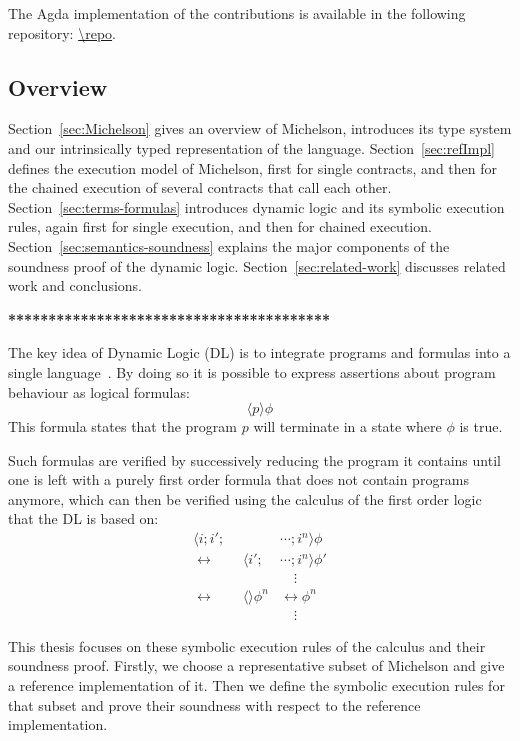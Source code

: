 The Agda implementation of the contributions is available in the
following repository: \url{\repo}. 

\subsection*{Overview}
\label{sec:overview}


Section~\ref{sec:Michelson} gives an overview of Michelson, introduces
its type system and our intrinsically typed representation of the language.
Section~\ref{sec:refImpl} defines the execution model of Michelson,
first for single contracts, and then for the chained execution of
several contracts that call each other.
Section~\ref{sec:terms-formulas} introduces dynamic logic and its
symbolic execution rules, again first for single execution, and then
for chained execution.
Section~\ref{sec:semantics-soundness} explains the major components of
the soundness proof of the dynamic logic.
Section~\ref{sec:related-work} discusses related work and conclusions.


\textbf{****************************************}

The key idea of Dynamic Logic (DL) is to integrate programs and formulas
into a single language~\cite{KeY3}.
By doing so it is possible to express assertions about program behaviour as logical formulas:
\[	\langle p \rangle \phi	\]
This formula states that the program $p$ will terminate in a state where $\phi$ is true.

Such formulas are verified by successively reducing the program it contains
until one is left with a purely first order formula that does not contain programs anymore,
which can then be verified using the calculus of the first order logic that
the DL is based on:
\begin{align*}
					\langle i ; i' ; &\cdots ; i^n \rangle \phi
\\ \leftrightarrow	\qquad		\langle     i' ; &\cdots ; i^n \rangle \phi'
\\							 &\quad\vdots
\\ \leftrightarrow	\qquad	\langle \rangle \phi^n	 &\leftrightarrow \phi^n
\\							 &\quad\vdots
\end{align*}

This thesis focuses on these symbolic execution rules of the calculus and their soundness proof.
Firstly, we choose a representative subset of Michelson
and give a reference implementation of it.
Then we define the symbolic execution rules for that subset
and prove their soundness with respect to the reference implementation.

